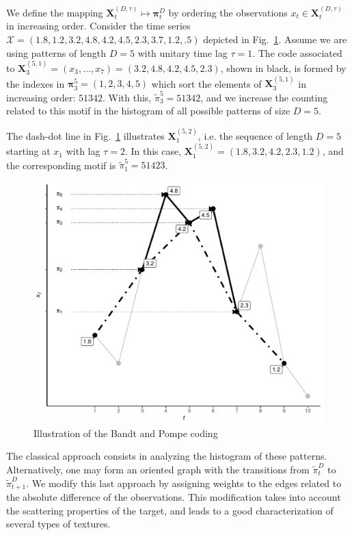 \documentclass{isprs}
\begin{document}
	We define the mapping ${\mathbf X}_t^{(D,\tau)} \mapsto {\mathbf \pi}_t^{D}$ by ordering the observations $x_t \in {\mathbf X}_t^{(D,\tau)}$ in increasing order.
	Consider the time series $\mathcal X = (1.8, 1.2, 3.2, 4.8, 4.2, 4.5, 2.3, 3.7, 1.2, .5)$ depicted in Fig.~\ref{Fig:IntroBP}.
	Assume we are using patterns of length $D=5$ with unitary time lag $\tau=1$.
	The code associated to $\mathbf X_{3}^{(5,1)}=(x_3,\dots,x_7)=(3.2, 4.8, 4.2, 4.5, 2.3)$, shown in black, is formed by the indexes in $\bm\pi_3^{5}=(1,2,3,4,5)$ which sort the elements of $\mathbf X_{3}^{(5,1)}$ in increasing order: $51342$.
	With this, $\widetilde{\pi}_3^{5} = 51342$, and we increase the counting related to this motif in the histogram of all possible patterns of size $D=5$.
	
	The dash-dot line in Fig.~\ref{Fig:IntroBP} illustrates $\mathbf X_{1}^{(5,2)}$, i.e. the sequence of length $D=5$ starting at $x_1$ with lag $\tau=2$.
	In this case, $\mathbf X_{1}^{(5,2)}= (1.8, 3.2, 4.2, 2.3, 1.2)$, and the corresponding motif is $\widetilde{\pi}_1^{5}=51423$.
	
	\begin{figure}[hbt]
		\centering
		\includegraphics[width=.9\linewidth]{../../Figures/IntroBP}
		\caption{Illustration of the Bandt and Pompe coding\label{Fig:IntroBP}}
	\end{figure}
	
	The classical approach consists in analyzing the histogram of these patterns.
	Alternatively, one may form an oriented graph with the transitions from $\widetilde\pi_t^D$ to $\widetilde\pi_{t+1}^D$.
	We modify this last approach by assigning weights to the edges related to the absolute difference of the observations.
	This modification takes into account the scattering properties of the target, and leads to a good characterization of several types of textures.
	
\end{document}
